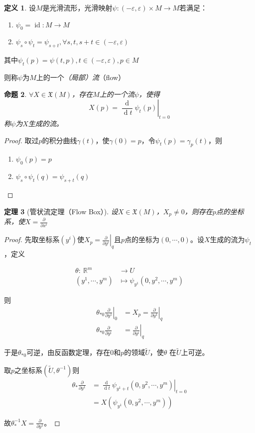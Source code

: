 \documentclass[winfonts,UTF8,c5size,a4paper,fancyhdr,hyperref,titlepage,nocap]{ctexart}
\newtheorem{thm}{定理}
\newtheorem{prop}[thm]{命题}
\theoremstyle{definition}
\newtheorem{defn}[thm]{定义}
\theoremstyle{remark}
\numberwithin{equation}{subsection}
\newcommand{\Real}{\mathbb{R}}
\newcommand{\red}{\color{red}}
\newcommand{\dt}{\frac{\operatorname{d}}{\operatorname{d}t}}
\newcommand{\pfrac}[2]{\frac{\partial{#1}}{\partial{#2}}}
\newcommand{\py}[1]{\left.\pfrac{}{y^{#1}}\right|_q}
\newcommand{\Xf}[1]{\mathfrak{X}(#1)}
\newcommand{\local}[2]{\left.{#1}\right|_{#2}}%
\newcommand{\localt}[1]{\local{#1}{t=0}}%
\newcommand{\mapdes}[5]
  {
    \begin{align*}
      #1\colon\  #2 & \longrightarrow  #3 \\
            #4 & \mapsto  #5
    \end{align*}
  }
\newcommand{\id}{\operatorname{id}}
\begin{document}
\begin{defn}
  设$M$是光滑流形，光滑映射$\psi\colon(-\varepsilon,\varepsilon)\times M\to M$若满足：
\begin{enumerate}[1)]
    \setlength{\itemindent}{2ex}
    \item $\psi_0=\id\colon M\to M$
    \item $\psi_{s}\circ\psi_{t}=\psi_{s+t}, \forall s,t,s+t\in(-\varepsilon,\varepsilon)$
\end{enumerate}
其中$\psi_{t}(p)=\psi(t,p), t\in(-\varepsilon,\varepsilon), p\in M$

则称$\psi$为$M$上的一个\emph{\red （局部）流}（flow）
\end{defn}
\begin{prop}
  $\forall X\in\Xf{M}$，存在$M$上的一个流$\psi$，使得
\begin{equation*}
X(p)=\localt{\dt\psi_t(p)}
\end{equation*}
称$\psi$为$X$生成的流。
\end{prop}
\begin{proof}
取过$p$的积分曲线$\gamma(t)$，使$\gamma(0)=p$，令$\psi_t(p)=\gamma_p(t)$，则
\begin{enumerate}[1)]
    \setlength{\itemindent}{2ex}
    \item $\psi_0(p)=p$
    \item $\psi_s\circ\psi_t(q)=\psi_{s+t}(q)$
\end{enumerate}
\end{proof}
\begin{thm}[管状流定理（Flow Box）]
设$X\in\Xf{M}$，$X_p\neq0$，则存在$p$点的坐标系，使$X=\pfrac{}{x^i}$
\end{thm}
\begin{proof}
  先取坐标系$(y^i)$使$X_p=\py{i}$且$p$点的坐标为$(0,\cdots,0)$。设$X$生成的流为$\psi_t$，定义
\mapdes{\theta}{\Real^m}{U}{(y^1,\cdots,y^m)}{\psi_{y^1}(0,y^2,\cdots,y^m)}
则
\begin{align*}
\theta_{\ast0}\local{\pfrac{}{y^1}}{0}&=X_p=\py{1}\\
\theta_{\ast0}\pfrac{}{y^i}&=\py{i}
\end{align*}

于是$\theta_{\ast0}$可逆，由反函数定理，存在$0$和$p$的领域$\widetilde{U}$，使$\theta$ 在$\widetilde{U}$上可逆。

取$p$之坐标系$(\widetilde{U},\theta^{-1})$则
\begin{align*}
\theta_{\ast}\pfrac{}{y^1}&=\localt{\dt\psi_{y^1+t}(0,y^2,\cdots,y^m)}\\
                          &=X(\psi_{y^1}(0,y^2,\cdots,y^m))
\end{align*}

故$\theta_{\ast}^{-1}X=\pfrac{}{y^1}$。
\end{proof}
\end{document}
